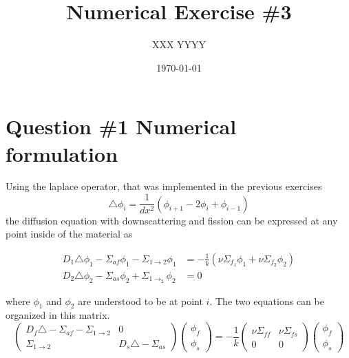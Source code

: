 \documentclass[11pt,a4paper]{article}
\begin{document}
\title{Numerical Exercise \#3}
\author{XXX YYYY\\  %
}
\date{\today}
\maketitle



\newpage
\section{Question \#1 Numerical formulation}

Using the laplace operator, that was implemented in the previous exercises
$$
\triangle \phi_{i} = \frac{1}{dx^2}(\phi_{i+1}- 2\phi_{i} + \phi_{i-1})
$$
the diffusion equation with downscattering and fission can be expressed at any point inside of the material as

\begin{align}
D_{1}\triangle\phi_{1}-\Sigma_{af}\phi_{1} - \Sigma_{1\to2} \phi_1 & = -\frac{1}{k}(\nu \Sigma_{f_{1}}\phi_{1} + \nu \Sigma_{f_{2}}\phi_{2}) \\
D_{2} \triangle\phi_{2} - \Sigma_{as}\phi_{2} + \Sigma_{1\to_{2}} \phi_{2}  & = 0
\end{align}

where $\phi_{1}$ and $\phi_{2}$ are understood to be at point $i$.
The two equations can be organized in this matrix.
$$
\begin{pmatrix}
D_{f} \triangle - \Sigma_{af} - \Sigma_{1\to2}  & 0 \\
\Sigma_{1\to2}  & D_{s} \triangle - \Sigma_{as}
\end{pmatrix} \begin{pmatrix}
\phi_{f} \\
\phi_{s}
\end{pmatrix} = -
\frac{1}{k} \begin{pmatrix}
\nu\Sigma_{ff}  & \nu\Sigma_{fs} \\
0 & 0
\end{pmatrix} \begin{pmatrix}
\phi_{f} \\
\phi_{s}
\end{pmatrix}
$$


\end{document}
